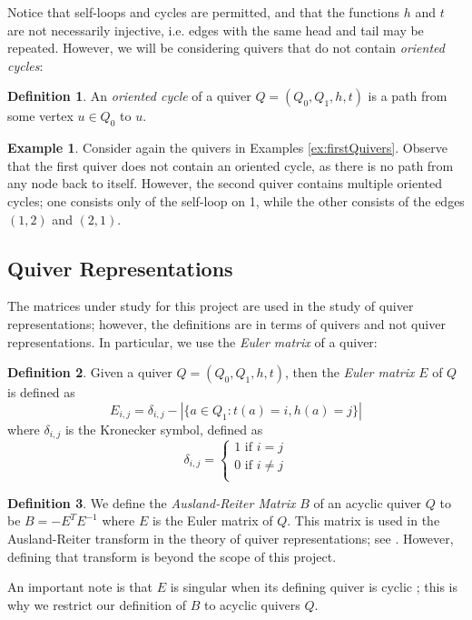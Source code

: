\documentclass{amsart}
\theoremstyle{theorem}
\theoremstyle{theorem*}
\theoremstyle{definition}
\newtheorem{example}[theorem]{Example}
\newtheorem{definition}{Definition}
\begin{document}
Notice that self-loops and cycles are permitted, and that the functions $h$ and
$t$ are not necessarily injective, i.e. edges with the same head and tail may be
repeated. However, we will be considering quivers that do not contain
\textit{oriented cycles}:

\begin{definition} \cite{dw} An \textit{oriented cycle} of a quiver $Q = (Q_0,
        Q_1, h, t)$ is a path from some vertex $u \in Q_0$ to $u$.
\end{definition}

\begin{example}
    Consider again the quivers in Examples \ref{ex:firstQuivers}. Observe that the first quiver
    does not contain an oriented cycle, as there is no path from
    any node back to itself. However, the second quiver contains multiple
    oriented cycles; one consists only of the self-loop on 1, while the other
    consists of the edges $(1,2)$ and $(2,1)$.
\end{example}

\subsection{Quiver Representations}

The matrices under study for this project are used in the study of quiver
representations; however, the definitions are in terms of quivers and not
quiver representations. In particular, we use the \textit{Euler matrix}
of a quiver:

\begin{definition} \cite{dw} Given a quiver $Q = (Q_0, Q_1, h, t)$, then the
    \textit{Euler matrix} $E$ of $Q$ is defined as
    $$E_{i,j} = \delta_{i,j} - |\{a \in Q_1 : t(a) = i, h(a) = j \}|$$
    where $\delta_{i,j}$ is the Kronecker symbol, defined as
    $$\delta_{i,j} = \begin{cases} 1 \text{ if } i = j \\ 0 \text{ if } i \neq j
            \\\end{cases}$$
\end{definition}

\begin{definition} We define the \textit{Ausland-Reiter Matrix} $B$ of an acyclic
    quiver $Q$ to be $B = - E^T E^{-1}$ where $E$ is the Euler matrix of $Q$.
    This matrix is used in the Ausland-Reiter transform in the theory of quiver
    representations; see \cite{dw}. However, defining that transform is beyond
    the scope of this project.

    An important note is that $E$ is singular when its defining quiver is cyclic
    \cite{dp}; this is why we restrict our definition of $B$ to acyclic quivers
    $Q$.
\end{definition}
\end{document}
